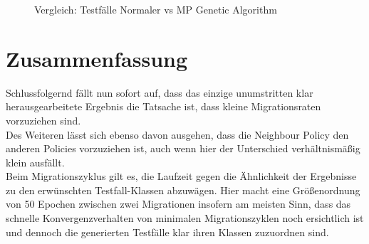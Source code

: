 \documentclass[12pt,a4paper]{article}
\begin{document}
\begin{figure}
\label{fig:cmp_spga_mpga_tcs}
\centering
{}
\caption{Vergleich: Testfälle Normaler vs MP Genetic Algorithm}
\end{figure}

\section{Zusammenfassung}
Schlussfolgernd fällt nun sofort auf, dass das einzige unumstritten klar herausgearbeitete Ergebnis die Tatsache ist, dass kleine Migrationsraten vorzuziehen sind.\\
Des Weiteren lässt sich ebenso davon ausgehen, dass die Neighbour Policy den anderen Policies vorzuziehen ist, auch wenn hier der Unterschied verhältnismäßig klein ausfällt.\\
Beim Migrationszyklus gilt es, die Laufzeit gegen die Ähnlichkeit der Ergebnisse zu den erwünschten Testfall-Klassen abzuwägen. Hier macht eine Größenordnung von 50 Epochen zwischen zwei Migrationen insofern am meisten Sinn, dass das schnelle Konvergenzverhalten von minimalen Migrationszyklen noch ersichtlich ist und dennoch die generierten Testfälle klar ihren Klassen zuzuordnen sind.
\end{document}
